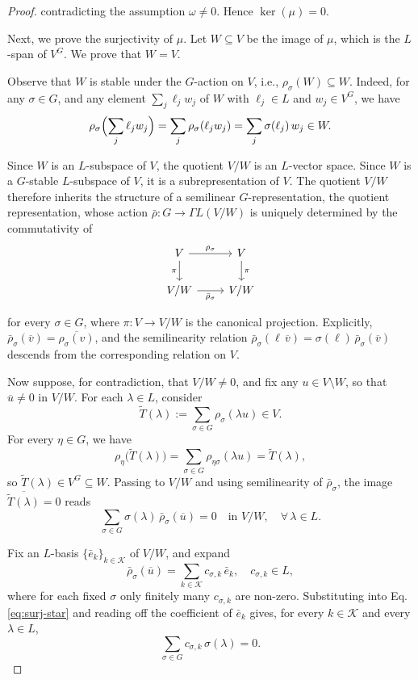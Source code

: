 \documentclass[10pt,a4paper]{amsart}
\begin{document}
\begin{proof}
contradicting the assumption $\omega\neq 0$. Hence $\ker(\mu)=0$.
	
	
Next, we prove the surjectivity of $\mu$. Let $W\subseteq V$ be the image of $\mu$, which is the $L$-span of $V^{G}$. We prove that $W=V$.
	
Observe that $W$ is stable under the $G$-action on $V$, i.e., $\rho_{\sigma}(W)\subseteq W$. Indeed, for any
$\sigma\in G$, and any element $\sum_{j}\ell_{j}w_{j}$ of $W$ with $\ell_{j}\in L$ and $w_{j}\in V^{G}$, we have
\[
\rho_{\sigma}\Bigl(\sum_{j}\ell_{j}w_{j}\Bigr)
=\sum_{j}\rho_{\sigma}(\ell_{j}w_{j})
=\sum_{j}\sigma(\ell_{j})\,w_{j}\in W.
\]


Since $W$ is an $L$-subspace of $V$, the quotient $V/W$ is an
$L$-vector space. Since $W$ is a $G$-stable $L$-subspace of $V$, it is a subrepresentation
of $V$. The quotient $V/W$ therefore inherits the structure of a
semilinear $G$-representation, the quotient representation,
whose action $\bar\rho\colon G\to \Gamma L(V/W)$ is uniquely determined
by the commutativity of
\[
\begin{tikzcd}
	V \arrow[r, "\rho_{\sigma}"] \arrow[d, "\pi"'] & V \arrow[d, "\pi"] \\
	V/W \arrow[r, "\bar\rho_{\sigma}"'] & V/W
\end{tikzcd}
\]

for every $\sigma\in G$, where $\pi\colon V\to V/W$ is the canonical
projection. Explicitly, $\bar\rho_{\sigma}(\overline{v})
=\overline{\rho_{\sigma}(v)}$, and the semilinearity relation
$\bar\rho_{\sigma}(\ell\,\overline{v})=\sigma(\ell)\,
\bar\rho_{\sigma}(\overline{v})$ descends from the corresponding
relation on $V$.

Now suppose, for contradiction, that $V/W\neq 0$, and fix any
$u\in V\setminus W$, so that $\overline{u}\neq 0$ in $V/W$. For each
$\lambda\in L$, consider
\[
\widetilde{T}(\lambda):=\sum_{\sigma\in G}\rho_{\sigma}(\lambda u)
\in V.
\]
For every $\eta\in G$, we have
\[
\rho_{\eta}\bigl(\widetilde{T}(\lambda)\bigr)
=\sum_{\sigma\in G}\rho_{\eta\sigma}(\lambda u)
=\widetilde{T}(\lambda),
\]
so $\widetilde{T}(\lambda)\in V^{G}\subseteq W$. Passing to $V/W$ and
using semilinearity of $\bar\rho_{\sigma}$, the image
$\overline{\widetilde{T}(\lambda)}=0$ reads
\begin{equation}\label{eq:surj-star}
	\sum_{\sigma\in G}\sigma(\lambda)\,\bar\rho_{\sigma}(\overline{u})=0
	\quad\text{in } V/W, \quad \forall\,\lambda\in L.
\end{equation}

Fix an $L$-basis $\{\bar e_{k}\}_{k\in\mathcal K}$ of $V/W$, and
expand
\[
\bar\rho_{\sigma}(\overline{u})=\sum_{k\in\mathcal K}c_{\sigma,k}\,
\bar e_{k}, \quad c_{\sigma,k}\in L,
\]
where for each fixed $\sigma$ only finitely many $c_{\sigma,k}$ are
non-zero. Substituting into Eq. \eqref{eq:surj-star} and reading off the
coefficient of $\bar e_{k}$ gives, for every $k\in\mathcal K$ and
every $\lambda\in L$,
\begin{equation}\label{eq:surj-char}
	\sum_{\sigma\in G}c_{\sigma,k}\,\sigma(\lambda)=0.
\end{equation}


\end{proof}
\end{document}
